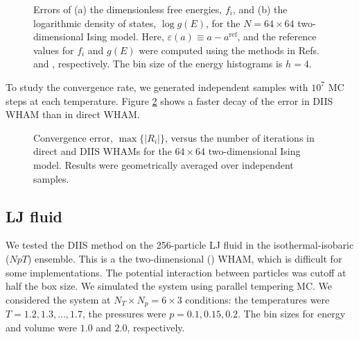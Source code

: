 \documentclass[reprint,aip,jcp,superscriptaddress]{revtex4-1}
\begin{document}
\begin{figure}[h]
  \caption{
    \label{fig:is2ref}
    Errors of
    (a) the dimensionless free energies, $f_i$, and
    (b) the logarithmic density of states, $\log g(E)$,
    for the $N = 64\times64$ two-dimensional Ising model.
    Here,
    $\varepsilon(a) \equiv a - a^\mathrm{ref}$,
    and the reference values for $f_i$ and $g(E)$
    were computed using the methods in
    Refs.  and ,
    respectively.
    The bin size of the energy histograms is $h = 4$.
  }
\end{figure}




To study the convergence rate,
we generated independent samples with
$10^7$ MC steps at each temperature.
%
Figure \ref{fig:is2trace}
shows a faster decay of the error
in DIIS WHAM
than in direct WHAM.






\begin{figure}[h]
  \caption{
    \label{fig:is2trace}
    Convergence error, $\max \{ |R_i| \}$,
    versus the number of iterations
    in direct and DIIS WHAMs
    for the $64\times64$ two-dimensional Ising model.
    Results were geometrically averaged over independent samples.
  }
\end{figure}




\subsection{\label{sec:results_LJ}
LJ fluid}


We tested the DIIS method
on the 256-particle LJ fluid in the isothermal-isobaric ($NpT$) ensemble.
%
This is a the two-dimensional () WHAM,
which is difficult for some implementations.
%
The potential interaction between particles was cutoff at half the box size.
%
We simulated the system 
using parallel tempering MC.
%
We considered the system
at $N_T \times N_p = 6\times 3$ conditions:
the temperatures were $T = 1.2, 1.3, \dots, 1.7$,
the pressures were $p = 0.1, 0.15, 0.2$.
%
The bin sizes for energy and volume
were $1.0$ and $2.0$, respectively.
\end{document}
